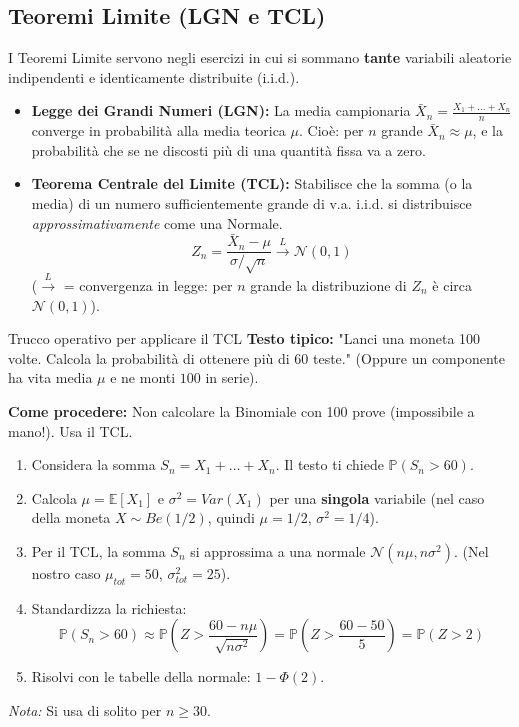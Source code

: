 \documentclass[12pt]{extarticle} %
\begin{document}
\subsection{Teoremi Limite (LGN e TCL)}
I Teoremi Limite servono negli esercizi in cui si sommano \textbf{tante} variabili aleatorie indipendenti e identicamente distribuite (i.i.d.).

\begin{itemize}
    \item \textbf{Legge dei Grandi Numeri (LGN):} La media campionaria $\bar{X}_n = \frac{X_1 + \dots + X_n}{n}$ converge in probabilità alla media teorica $\mu$. {\footnotesize Cioè: per $n$ grande $\bar X_n \approx \mu$, e la probabilità che se ne discosti più di una quantità fissa va a zero.}
    \item \textbf{Teorema Centrale del Limite (TCL):} Stabilisce che la somma (o la media) di un numero sufficientemente grande di v.a. i.i.d. si distribuisce \textit{approssimativamente} come una Normale.
    $$ Z_n = \frac{\bar{X}_n - \mu}{\sigma/\sqrt{n}} \xrightarrow{L} \mathcal{N}(0, 1) $$
    {\footnotesize ($\xrightarrow{L}$ = convergenza in legge: per $n$ grande la distribuzione di $Z_n$ è circa $\mathcal{N}(0,1)$).}
\end{itemize}

\begin{eserciziobox}{Trucco operativo per applicare il TCL}
\textbf{Testo tipico:} "Lanci una moneta 100 volte. Calcola la probabilità di ottenere più di 60 teste." (Oppure un componente ha vita media $\mu$ e ne monti $100$ in serie).
\par\textbf{Come procedere:} Non calcolare la Binomiale con 100 prove (impossibile a mano!). Usa il TCL.
\begin{enumerate}
    \item Considera la somma $S_n = X_1 + \dots + X_n$. Il testo ti chiede $\mathbb{P}(S_n > 60)$.
    \item Calcola $\mu = \mathbb{E}[X_1]$ e $\sigma^2 = Var(X_1)$ per una \textbf{singola} variabile (nel caso della moneta $X \sim Be(1/2)$, quindi $\mu=1/2$, $\sigma^2=1/4$).
    \item Per il TCL, la somma $S_n$ si approssima a una normale $\mathcal{N}(n\mu, n\sigma^2)$. (Nel nostro caso $\mu_{tot} = 50$, $\sigma_{tot}^2 = 25$).
    \item Standardizza la richiesta:
    $$ \mathbb{P}(S_n > 60) \approx \mathbb{P}\left(Z > \frac{60 - n\mu}{\sqrt{n\sigma^2}}\right) = \mathbb{P}\left(Z > \frac{60 - 50}{5}\right) = \mathbb{P}(Z > 2) $$
    \item Risolvi con le tabelle della normale: $1 - \Phi(2)$.
\end{enumerate}
\textit{Nota:} Si usa di solito per $n \ge 30$.
\end{eserciziobox}
\end{document}
